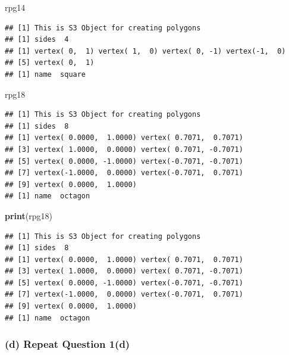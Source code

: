 \documentclass[]{article}
\newenvironment{Shaded}{\begin{snugshade}}{\end{snugshade}}
\newcommand{\KeywordTok}[1]{\textcolor[rgb]{0.13,0.29,0.53}{\textbf{#1}}}
\newcommand{\NormalTok}[1]{#1}
\begin{document}
\begin{Shaded}
\begin{Highlighting}[]
\NormalTok{rpg14}
\end{Highlighting}
\end{Shaded}

\begin{verbatim}
## [1] This is S3 Object for creating polygons
## [1] sides  4
## [1] vertex( 0,  1) vertex( 1,  0) vertex( 0, -1) vertex(-1,  0)
## [5] vertex( 0,  1)
## [1] name  square
\end{verbatim}

\begin{Shaded}
\begin{Highlighting}[]
\NormalTok{rpg18}
\end{Highlighting}
\end{Shaded}

\begin{verbatim}
## [1] This is S3 Object for creating polygons
## [1] sides  8
## [1] vertex( 0.0000,  1.0000) vertex( 0.7071,  0.7071)
## [3] vertex( 1.0000,  0.0000) vertex( 0.7071, -0.7071)
## [5] vertex( 0.0000, -1.0000) vertex(-0.7071, -0.7071)
## [7] vertex(-1.0000,  0.0000) vertex(-0.7071,  0.7071)
## [9] vertex( 0.0000,  1.0000)
## [1] name  octagon
\end{verbatim}

\begin{Shaded}
\begin{Highlighting}[]
\KeywordTok{print}\NormalTok{(rpg18)}
\end{Highlighting}
\end{Shaded}

\begin{verbatim}
## [1] This is S3 Object for creating polygons
## [1] sides  8
## [1] vertex( 0.0000,  1.0000) vertex( 0.7071,  0.7071)
## [3] vertex( 1.0000,  0.0000) vertex( 0.7071, -0.7071)
## [5] vertex( 0.0000, -1.0000) vertex(-0.7071, -0.7071)
## [7] vertex(-1.0000,  0.0000) vertex(-0.7071,  0.7071)
## [9] vertex( 0.0000,  1.0000)
## [1] name  octagon
\end{verbatim}

\subsubsection{(d) Repeat Question 1(d)}\label{d-repeat-question-1d}
\end{document}
